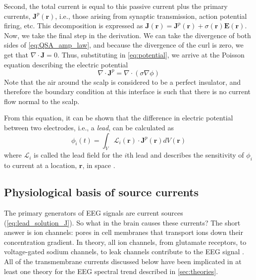 Second, the total current is equal to this passive current plus the primary currents, $\bm{J}^p(\bm{r})$, i.e., those arising from synaptic transmission, action potential firing, etc. This decomposition is expressed as $\bm{J}(\bm{r}) = \bm{J}^p(\bm{r}) + \sigma(\bm{r}) \bm{E}(\bm{r})$. Now, we take the final step in the derivation. We can take the divergence of both sides of \ref{eq:QSA_amp_law}, and because the divergence of the curl is zero, we get that $\nabla \cdot \bm{J} = 0$. Thus, substituting in \ref{eq:potential}, we arrive at the Poisson equation describing the electric potential
\begin{equation} \label{eq:poisson}
    \nabla \cdot \bm{J}^p = \nabla \cdot \left(\sigma \nabla \phi \right)
\end{equation}
Note that the air around the scalp is considered to be a perfect insulator, and therefore the boundary condition at this interface is such that there is no current flow normal to the scalp. 

From this equation, it can be shown that the difference in electric potential between two electrodes, i.e., a \textit{lead}, can be calculated as \cite{RevModPhys.65.413}
\begin{equation} \label{eq:lead_solution_J}
    \phi_i(t) = \int_V \mathcal{L}_i(\bm{r}) \cdot \bm{J}^p(\bm{r}) dV(\bm{r})
\end{equation}
where $\mathcal{L}_i$ is called the lead field for the $i$th lead  and describes the sensitivity of $\phi_i$ to current at a location, $\bm{r}$, in space \cite{Malmivuo1995}. 

\subsection{Physiological basis of source currents}
The primary generators of EEG signals are current sources (\ref{eq:lead_solution_J}). So what in the brain causes these currents? The short answer is ion channels: pores in cell membranes that transport ions down their concentration gradient. In theory, all ion channels, from glutamate receptors, to voltage-gated sodium channels, to leak channels contribute to the EEG signal \cite{Buzsaki2012}. All of the transmembrane currents discussed below have been implicated in at least one theory for the EEG spectral trend described in \autoref{sec:theories}.

